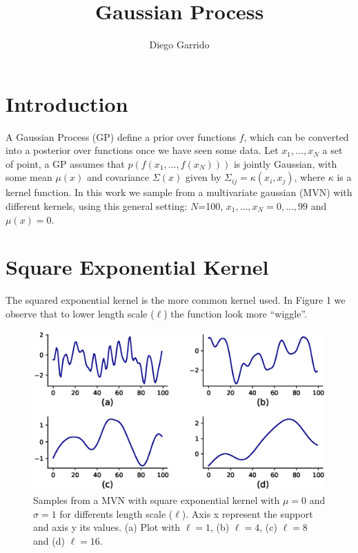 \documentclass{article}
\title{Gaussian Process}
\author{Diego Garrido}
\newcommand{\quotes}[1]{``#1''}
\begin{document}
\maketitle
\href{https://nbviewer.jupyter.org/github/dgarridoa/gaussian_process/blob/master/Gaussian_Process.ipynb}{\color{blue}{Jupyter Notebook}}

\section{Introduction}
A Gaussian Process (GP) define a prior over functions $f$, which can be converted into a posterior over functions once we have seen some data. Let $x_{1}, \ldots, x_{N}$ a set of point, a GP assumes that $p(f(x_{1}, \ldots, f(x_{N})))$ is jointly Gaussian, with some mean $\mu(x)$ and covariance $\Sigma(x)$ given by $\Sigma_{ij}=\kappa(x_{i}, x_{j})$, where $\kappa$ is a kernel function. In this work we sample from a multivariate gaussian (MVN) with different kernels, using this general setting: $N$=100, $x_{1}, \ldots, x_{N} = 0, \ldots, 99$ and $\mu(x)=0$.

\section{Square Exponential Kernel}

The squared exponential kernel is the more common kernel used. In Figure 1 we observe that to lower length scale ($\ell$) the function look more \quotes{wiggle}.

\begin{figure}[h]
\centering
\includegraphics[scale=0.45]{img/square_exponential.eps}  
\caption{Samples from a MVN with square exponential kernel with $\mu=0$ and $\sigma=1$ for differents length scale ($\ell$). Axis x represent the support and axis y its values. (a) Plot with $\ell=1$, (b) $\ell=4$, (c) $\ell=8$ and (d) $\ell=16$.}
\end{figure}
\end{document}
